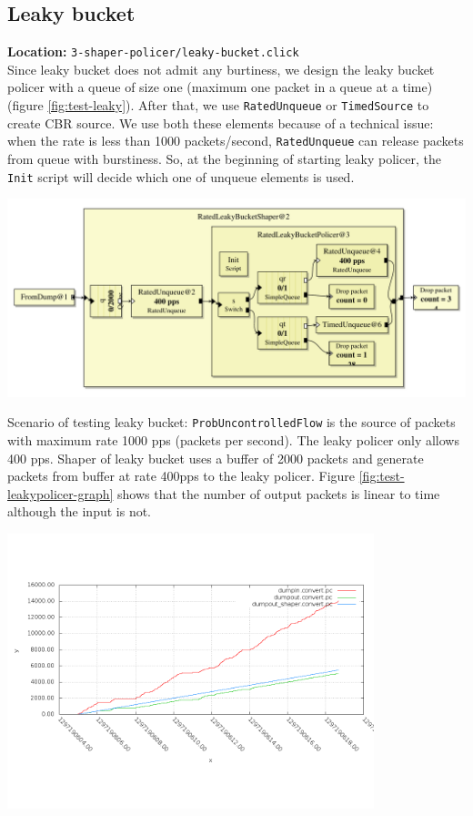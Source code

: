 \documentclass[a4paper]{article}
\begin{document}
  \subsection{Leaky bucket}
  \textbf{Location:} \texttt{3-shaper-policer/leaky-bucket.click} \\
  Since leaky bucket does not admit any burtiness, we design the leaky bucket policer with a queue of size one (maximum one packet in a queue at a time) (figure \ref{fig:test-leaky}). After that, we use \texttt{RatedUnqueue} or \texttt{TimedSource} to create CBR source. We use both these elements because of a technical issue: when the rate is less than 1000 packets/second, \texttt{RatedUnqueue} can release packets from queue with burstiness. So, at the beginning of starting leaky policer, the \texttt{Init} script will decide which one of unqueue elements is used.
  \begin{center}
	\includegraphics[width=1.0\textwidth]{leaky-shaper.pdf}
	\label{fig:test-leaky}
  \end{center}
  Scenario of testing leaky bucket: \texttt{ProbUncontrolledFlow} is the source of packets with maximum rate 1000 pps (packets per second). The leaky policer only allows 400 pps. Shaper of leaky bucket uses a buffer of 2000 packets and generate packets from buffer at rate 400pps to the leaky policer. Figure \ref{fig:test-leakypolicer-graph} shows that the number of output packets is linear to time although the input is not.  
  \begin{center}
	\includegraphics[width=0.8\textwidth]{leaky-count.png}
	\label{fig:test-leakypolicer-graph}
  \end{center} 
  
\end{document}
